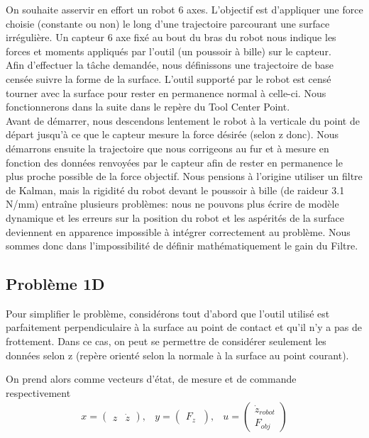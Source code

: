 \documentclass[12pt,twoside,a4paper]{article}
\begin{document}
On souhaite asservir en effort un robot 6 axes. L'objectif est d'appliquer une force choisie (constante ou non) le long d'une trajectoire parcourant une surface irrégulière. Un capteur 6 axe fixé au bout du bras du robot nous indique les forces et moments appliqués par l'outil (un poussoir à bille) sur le capteur. \\
Afin d'effectuer la tâche demandée, nous définissons une trajectoire de base censée suivre la forme de la surface. L'outil supporté par le robot est censé tourner avec la surface pour rester en permanence normal à celle-ci. Nous fonctionnerons dans la suite dans le repère du Tool Center Point.\\
 Avant de démarrer, nous descendons lentement le robot à la verticale du point de départ jusqu'à ce que le capteur mesure la force désirée (selon z donc). Nous démarrons ensuite la trajectoire que nous corrigeons au fur et à mesure en fonction des données renvoyées par le capteur afin de rester en permanence le plus proche possible de la force objectif. Nous pensions à l'origine utiliser un filtre de Kalman, mais la rigidité du robot devant le poussoir à bille (de raideur 3.1 N/mm) entraîne plusieurs problèmes: nous ne pouvons plus écrire de modèle dynamique et les erreurs sur la position du robot et les aspérités de la surface deviennent en apparence impossible à intégrer correctement au problème. Nous sommes donc dans l'impossibilité de définir mathématiquement le gain du Filtre.


\subsection{Problème 1D}

Pour simplifier le problème, considérons tout d'abord que l'outil utilisé est parfaitement perpendiculaire à la surface au point de contact et qu'il n'y a pas de frottement. Dans ce cas, on peut se permettre de considérer seulement les données selon z (repère orienté selon la normale à la surface au point courant).

On prend alors comme vecteurs d'état, de mesure et de commande respectivement
$$
\begin{array}{ccc}
x =  \begin{pmatrix} z & \dot{z} \end{pmatrix} 
,   & 
y= \begin{pmatrix}
 F_z \
\end{pmatrix},   &
u = \begin{pmatrix} \dot{z}_{robot} \\ F_{obj}\end{pmatrix} \\
\end{array}
$$
\end{document}
